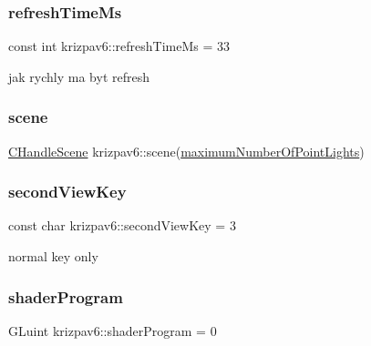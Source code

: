 \mbox{\label{namespacekrizpav6_a66babf7c7765b82dbcea7471e2455f19}} 
\subsubsection{\texorpdfstring{refreshTimeMs}{refreshTimeMs}}
{\footnotesize\ttfamily const int krizpav6\+::refresh\+Time\+Ms = 33}



jak rychly ma byt refresh 

\mbox{\label{namespacekrizpav6_acfe889a340fee22e70659028eaab6b3d}} 
\subsubsection{\texorpdfstring{scene}{scene}}
{\footnotesize\ttfamily \mbox{\hyperlink{classkrizpav6_1_1_c_handle_scene}{C\+Handle\+Scene}} krizpav6\+::scene(\mbox{\hyperlink{namespacekrizpav6_a5de8451389cb23317a51c171c120ed5b}{maximum\+Number\+Of\+Point\+Lights}})}

\mbox{\label{namespacekrizpav6_a8b32ae658845e7457189efe25826c6da}} 
\subsubsection{\texorpdfstring{secondViewKey}{secondViewKey}}
{\footnotesize\ttfamily const char krizpav6\+::second\+View\+Key = \textquotesingle{}3\textquotesingle{}}



normal key only 

\mbox{\label{namespacekrizpav6_a62f68ac39bd943907741993a8df24cfa}} 
\subsubsection{\texorpdfstring{shaderProgram}{shaderProgram}}
{\footnotesize\ttfamily G\+Luint krizpav6\+::shader\+Program = 0}



